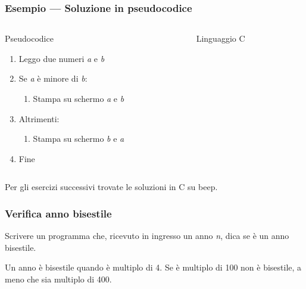 \documentclass[aspectratio=169]{beamer}
\begin{document}
\begin{frame}[fragile]
	\frametitle{Esempio --- Soluzione in pseudocodice}
    \begin{columns}
        \begin{column}{0.4\textwidth}
            \begin{block}{Pseudocodice}
                \begin{enumerate}
                    \item Leggo due numeri \emph{a} e \emph{b}
                    \item Se \emph{a} è minore di \emph{b}:
                        \begin{enumerate}
                            \item Stampa su schermo \emph{a} e \emph{b}
                        \end{enumerate}
                    \item Altrimenti:
                        \begin{enumerate}
                            \item Stampa su schermo \emph{b} e \emph{a}
                        \end{enumerate}
                    \item Fine
                \end{enumerate}
            \end{block}
        \end{column}

        \pause
        \begin{column}{0.4\textwidth}
            \begin{block}{Linguaggio C}
                
            \end{block}
        \end{column}
    \end{columns}

    Per gli esercizi successivi trovate le soluzioni in C su beep.
\end{frame}

\begin{frame}
\frametitle{Verifica anno bisestile}
Scrivere un programma che, ricevuto in ingresso un anno \emph{n}, dica se è un anno bisestile.

Un anno è bisestile quando è multiplo di 4. Se è multiplo di 100 non è bisestile, a meno che sia multiplo di 400.
\end{frame}
\end{document}
